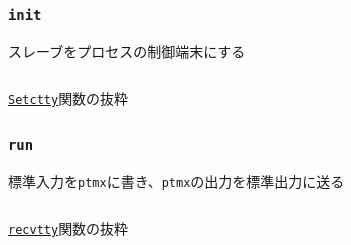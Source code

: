 \documentclass[unicode, 14pt, aspectratio=169]{beamer}
\begin{document}
\begin{frame}[t]
  \frametitle{\texttt{init}}
  スレーブをプロセスの制御端末にする\supercite{ioctl}
  \begin{center}
    \inputminted{go}{code/pty_tty.go}
    \href{https://github.com/opencontainers/runc/blob/7cb363254b69e10320360b63fb73e0ffb5da7bf2/libcontainer/system/linux.go\#L121}{\texttt{Setctty}}関数の抜粋
  \end{center}
\end{frame}
\begin{frame}[t]
  \frametitle{\texttt{run}}
  標準入力を\texttt{ptmx}に書き、\texttt{ptmx}の出力を標準出力に送る
  \begin{center}
    \inputminted{go}{code/tty_run.go}
    \href{https://github.com/opencontainers/runc/blob/7cb363254b69e10320360b63fb73e0ffb5da7bf2/tty.go\#L102}{\texttt{recvtty}}関数の抜粋
  \end{center}
\end{frame}
\end{document}

